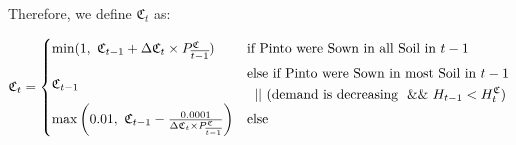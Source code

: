 \documentclass[class=article, crop=false]{standalone}
\begin{document}
\begin{keepunit}
Therefore, we define $\mathfrak{C}_{t}$ as:

    $$
        \mathfrak{C}_{t} =
        \begin{cases}
            \min(1,\ \mathfrak{C}_{t-1}+\Delta\mathfrak{C}_{t}\times P_{\overline{t-1}}^{\mathfrak{C}})
                & \text{if Pinto were Sown in all Soil in }t-1\\[2mm]
            \mathfrak{C}_{t-1}
                & \begin{gathered}\text{else if Pinto were Sown in most Soil in }t-1\\\mkern6mu || \mkern6mu (\text{demand is decreasing }\mkern6mu \&\& \mkern6mu H_{t-1}<H_t^{\mathfrak{C}})\end{gathered}\\[2mm]
            \max\left(0.01,\ \mathfrak{C}_{t-1}-\frac{0.0001}{\Delta\mathfrak{C}_{t}\times P_{\overline{t-1}}^{\mathfrak{C}}}\right)
                & \text{else}
        \end{cases}
    $$
\end{keepunit}

\endgroup
\end{document}
